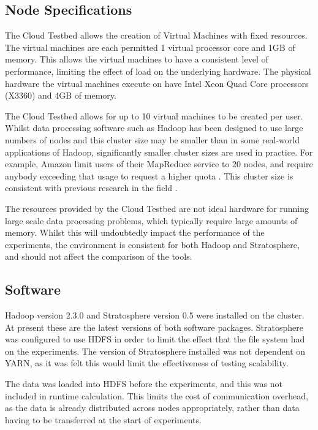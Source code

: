 \subsection{Node Specifications}
The Cloud Testbed allows the creation of Virtual Machines with fixed resources. The virtual machines are each permitted 1 virtual processor core and 1GB of memory. This allows the virtual machines to have a consistent level of performance, limiting the effect of load on the underlying hardware. The physical hardware the virtual machines execute on have Intel Xeon Quad Core processors (X3360) and 4GB of memory.

The Cloud Testbed allows for up to 10 virtual machines to be created per user. Whilst data processing software such as Hadoop has been designed to use large numbers of nodes and this cluster size may be smaller than in some real-world applications of Hadoop, significantly smaller cluster sizes are used in practice. For example, Amazon limit users of their MapReduce service to 20 nodes, and require anybody exceeding that usage to request a higher quota \cite{emrlimits}. This cluster size is consistent with previous research in the field \cite{warneke2011exploiting}.

The resources provided by the Cloud Testbed are not ideal hardware for running large scale data processing problems, which typically require large amounts of memory. Whilst this will undoubtedly impact the performance of the experiments, the environment is consistent for both Hadoop and Stratosphere, and should not affect the comparison of the tools.

\subsection{Software}
Hadoop version 2.3.0 and Stratosphere version 0.5 were installed on the cluster. At present these are the latest versions of both software packages. Stratosphere was configured to use HDFS in order to limit the effect that the file system had on the experiments. The version of Stratosphere installed was not dependent on YARN, as it was felt this would limit the effectiveness of testing scalability.

The data was loaded into HDFS before the experiments, and this was not included in runtime calculation. This limits the cost of communication overhead, as the data is already distributed across nodes appropriately, rather than data having to be transferred at the start of experiments. 

